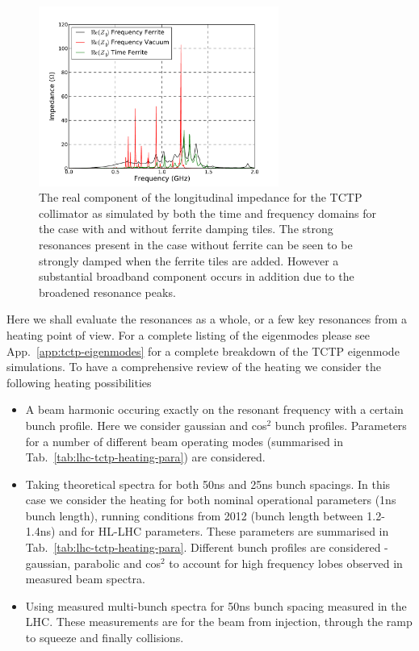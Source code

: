 \begin{figure}
\begin{center}
\includegraphics[width=0.7\textwidth]{LHC_Collimation_Upgrades/figures/longitudinal-impedance-tctp-ferr-freq-dom.pdf}
\end{center}
\label{fig:long-imp-tctp-freq}
\caption{The real component of the longitudinal impedance for the TCTP collimator as simulated by both the time and frequency domains for the case with and without ferrite damping tiles. The strong resonances present in the case without ferrite can be seen to be strongly damped when the ferrite tiles are added. However a substantial broadband component occurs in addition due to the broadened resonance peaks.}
\end{figure}

Here we shall evaluate the resonances as a whole, or a few key resonances from a heating point of view. For a complete listing of the eigenmodes please see App.~\ref{app:tctp-eigenmodes} for a complete breakdown of the TCTP eigenmode simulations. To have a comprehensive review of the heating we consider the following heating possibilities

\begin{itemize}
\item{A beam harmonic occuring exactly on the resonant frequency with a certain bunch profile. Here we consider gaussian and cos$^{2}$ bunch profiles. Parameters for a number of different beam operating modes (summarised in Tab.~\ref{tab:lhc-tctp-heating-para}) are considered.}
\item{Taking theoretical spectra for both 50ns and 25ns bunch spacings. In this case we consider the heating for both nominal operational parameters (1ns bunch length), running conditions from 2012 (bunch length between 1.2-1.4ns) and for HL-LHC parameters. These parameters are summarised in Tab.~\ref{tab:lhc-tctp-heating-para}. Different bunch profiles are considered - gaussian, parabolic and cos$^{2}$ to account for high frequency lobes observed in measured beam spectra.}
\item{Using measured multi-bunch spectra for 50ns bunch spacing measured in the LHC. These measurements are for the beam from injection, through the ramp to squeeze and finally collisions.}
\end{itemize}

